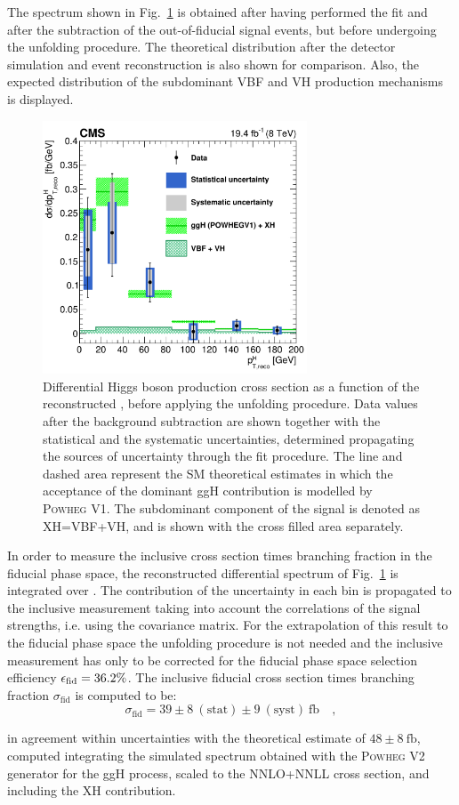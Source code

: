 The spectrum shown in Fig.~\ref{fig:pre_unfolding} is obtained after having performed the fit and after the subtraction of the out-of-fiducial signal events, but before undergoing the unfolding procedure. The theoretical distribution after the detector simulation and event reconstruction is also shown for comparison. Also, the expected distribution of the subdominant VBF and VH production mechanisms is displayed.

\begin{figure}[htb]
\centering
\includegraphics[width=0.7\textwidth]{images/unblinding/pth_reco_paper.pdf}
\caption{Differential Higgs boson production cross section as a function of the reconstructed \pth{}, before applying the unfolding procedure. Data values after the background subtraction are shown together with the statistical and the systematic uncertainties, determined propagating the sources of uncertainty through the fit procedure. The line and dashed area represent the SM theoretical estimates in which the acceptance of the dominant ggH contribution is modelled by \textsc{Powheg V1}. The subdominant component of the signal is denoted as XH=VBF+VH, and is shown with the cross filled area separately.}\label{fig:pre_unfolding}
\end{figure}

In order to measure the inclusive cross section times branching fraction in the fiducial phase space, the reconstructed differential spectrum of Fig.~\ref{fig:pre_unfolding} is integrated over \pth. The contribution of the uncertainty in each bin is propagated to the inclusive measurement taking into account the correlations of the signal strengths, i.e. using the covariance matrix. For the extrapolation of this result to the fiducial phase space the unfolding procedure is not needed and the inclusive measurement has only to be corrected for the fiducial phase space selection efficiency $\epsilon_{\rm{fid}} = 36.2\%$. The inclusive fiducial cross section times branching fraction $\sigma_{\mathrm{fid}}$ is computed to be:
\begin{equation}
\sigma_{\mathrm{fid}} = 39\pm 8~(\mathrm{stat}) \pm 9~(\mathrm{syst})~\mathrm{fb} \quad ,
\end{equation} 

\noindent in agreement within uncertainties with the theoretical estimate of $48 \pm 8 ~\mathrm{fb}$, computed integrating the simulated spectrum obtained with the \textsc{Powheg V2} generator for the ggH process, scaled to the NNLO+NNLL cross section, and including the XH contribution.


